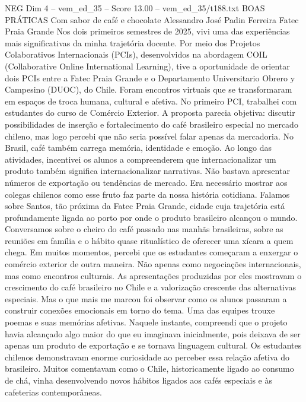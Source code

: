 \begin{textsample}{NEG Dim 4 – vem\_ed\_35 – Score 13.00 – vem\_ed\_35/t188.txt}  \label{ex:f4_neg_167}
BOAS PRÁTICAS Com sabor de café e chocolate Alessandro José Padin Ferreira Fatec Praia Grande Nos dois primeiros semestres de 2025, vivi uma das experiências mais significativas da minha trajetória docente.
Por meio dos Projetos Colaborativos Internacionais (PCIs), desenvolvidos na abordagem COIL (Collaborative Online International Learning), tive a oportunidade de orientar dois PCIs entre a Fatec Praia Grande e o Departamento Universitario Obrero y Campesino (DUOC), do Chile.
Foram encontros virtuais que se transformaram em espaços de troca humana, cultural e afetiva.
No primeiro PCI, trabalhei com estudantes do curso de Comércio Exterior.
A proposta parecia objetiva: discutir possibilidades de inserção e fortalecimento do café brasileiro especial no mercado chileno, mas logo percebi que não seria possível falar apenas da mercadoria.
No Brasil, café também carrega memória, identidade e emoção.
Ao longo das atividades, incentivei os alunos a compreenderem que internacionalizar um produto também significa internacionalizar narrativas.
Não bastava apresentar números de exportação ou tendências de mercado.
Era necessário mostrar aos colegas chilenos como esse fruto faz parte da nossa história cotidiana.
Falamos sobre Santos, tão próxima da Fatec Praia Grande, cidade cuja trajetória está profundamente ligada ao porto por onde o produto brasileiro alcançou o mundo.
Conversamos sobre o cheiro do café passado nas manhãs brasileiras, sobre as reuniões em família e o hábito quase ritualístico de oferecer uma xícara a quem chega.
Em muitos momentos, percebi que os estudantes começaram a enxergar o comércio exterior de outra maneira.
Não apenas como negociações internacionais, mas como encontros culturais.
As apresentações produzidas por eles mostravam o crescimento do café brasileiro no Chile e a valorização crescente das alternativas especiais.
Mas o que mais me marcou foi observar como os alunos passaram a construir conexões emocionais em torno do tema.
Uma das equipes trouxe poemas e suas memórias afetivas.
Naquele instante, compreendi que o projeto havia alcançado algo maior do que eu imaginava inicialmente, pois deixava de ser apenas um produto de exportação e se tornava linguagem cultural.
Os estudantes chilenos demonstravam enorme curiosidade ao perceber essa relação afetiva do brasileiro.
Muitos comentavam como o Chile, historicamente ligado ao consumo de chá, vinha desenvolvendo novos hábitos ligados aos cafés especiais e às cafeterias contemporâneas.

\end{textsample}
